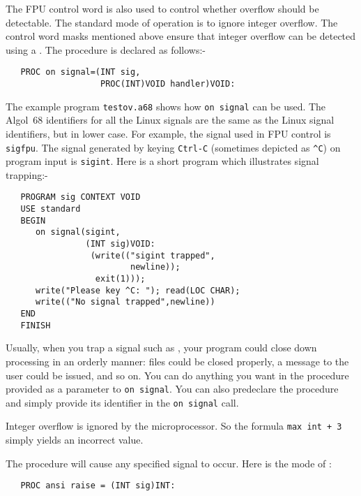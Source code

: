The FPU control word is also used to control whether overflow should
be detectable. The standard mode of operation is to ignore integer
overflow. The control word masks mentioned above ensure that integer
overflow can be detected using a . The procedure
 is declared as follows:-
\begin{verbatim}
   PROC on signal=(INT sig,
                   PROC(INT)VOID handler)VOID:
\end{verbatim}
\noindent
The example program \verb|testov.a68| shows how \verb|on signal| can be
used. The Algol~68 identifiers for all the Linux signals are the same
as the Linux signal identifiers, but in lower case. For example, the
signal used in FPU control is \verb|sigfpu|. The signal generated by
keying \verb|Ctrl-C| (sometimes depicted as \verb|^C|) on program input
is \verb|sigint|. Here is a short program which illustrates signal
trapping:-
\begin{verbatim}
   PROGRAM sig CONTEXT VOID
   USE standard
   BEGIN
      on signal(sigint,
                (INT sig)VOID:
                 (write(("sigint trapped",
                         newline));
                  exit(1)));
      write("Please key ^C: "); read(LOC CHAR);
      write(("No signal trapped",newline))
   END
   FINISH
\end{verbatim}
\noindent
Usually, when you trap a signal such as , your program
could close down processing in an orderly manner: files could be closed
properly, a message to the user could be issued, and so on. You can do
anything you want in the procedure provided as a parameter to
\verb|on signal|. You can also predeclare the procedure and simply
provide its identifier in the \verb|on signal| call.

Integer overflow is ignored by the microprocessor. So the
formula \verb|max int + 3| simply yields an incorrect value.

The procedure  will cause any specified signal to
occur. Here is the mode of :
\begin{verbatim}
   PROC ansi raise = (INT sig)INT:
\end{verbatim}

